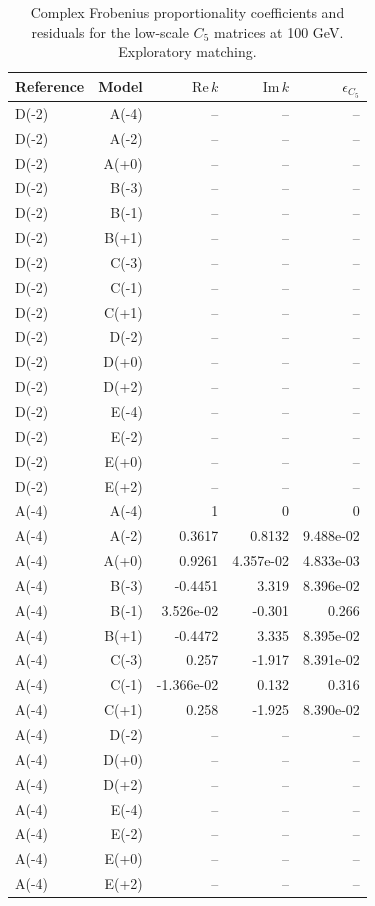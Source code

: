 \begin{table}[htbp]
\centering
\small
\setlength{\tabcolsep}{3.4pt}
\begin{tabular}{lrrrr}
\hline
Reference & Model & $\mathrm{Re}\,k$ & $\mathrm{Im}\,k$ & $\epsilon_{C_5}$ \\
\hline
D(-2) & A(-4) & -- & -- & -- \\
D(-2) & A(-2) & -- & -- & -- \\
D(-2) & A(+0) & -- & -- & -- \\
D(-2) & B(-3) & -- & -- & -- \\
D(-2) & B(-1) & -- & -- & -- \\
D(-2) & B(+1) & -- & -- & -- \\
D(-2) & C(-3) & -- & -- & -- \\
D(-2) & C(-1) & -- & -- & -- \\
D(-2) & C(+1) & -- & -- & -- \\
D(-2) & D(-2) & -- & -- & -- \\
D(-2) & D(+0) & -- & -- & -- \\
D(-2) & D(+2) & -- & -- & -- \\
D(-2) & E(-4) & -- & -- & -- \\
D(-2) & E(-2) & -- & -- & -- \\
D(-2) & E(+0) & -- & -- & -- \\
D(-2) & E(+2) & -- & -- & -- \\
A(-4) & A(-4) & 1 & 0 & 0 \\
A(-4) & A(-2) & 0.3617 & 0.8132 & 9.488e-02 \\
A(-4) & A(+0) & 0.9261 & 4.357e-02 & 4.833e-03 \\
A(-4) & B(-3) & -0.4451 & 3.319 & 8.396e-02 \\
A(-4) & B(-1) & 3.526e-02 & -0.301 & 0.266 \\
A(-4) & B(+1) & -0.4472 & 3.335 & 8.395e-02 \\
A(-4) & C(-3) & 0.257 & -1.917 & 8.391e-02 \\
A(-4) & C(-1) & -1.366e-02 & 0.132 & 0.316 \\
A(-4) & C(+1) & 0.258 & -1.925 & 8.390e-02 \\
A(-4) & D(-2) & -- & -- & -- \\
A(-4) & D(+0) & -- & -- & -- \\
A(-4) & D(+2) & -- & -- & -- \\
A(-4) & E(-4) & -- & -- & -- \\
A(-4) & E(-2) & -- & -- & -- \\
A(-4) & E(+0) & -- & -- & -- \\
A(-4) & E(+2) & -- & -- & -- \\
\hline
\end{tabular}
\caption{Complex Frobenius proportionality coefficients and residuals for the low-scale $C_5$ matrices at 100 GeV. Exploratory matching.}
\label{tab:generalised_b4}
\end{table}
